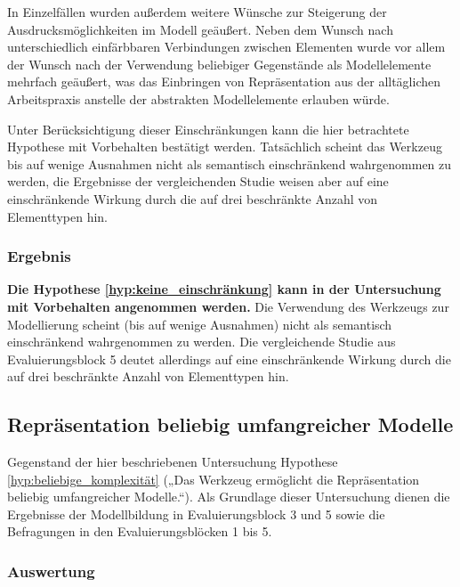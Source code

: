 In Einzelfällen wurden außerdem weitere Wünsche zur Steigerung der Ausdrucksmöglichkeiten im Modell geäußert. Neben dem Wunsch nach unterschiedlich einfärbbaren Verbindungen zwischen Elementen wurde vor allem der Wunsch nach der Verwendung beliebiger Gegenstände als Modellelemente mehrfach geäußert, was das Einbringen von Repräsentation aus der alltäglichen Arbeitspraxis anstelle der abstrakten Modellelemente erlauben würde.

Unter Berücksichtigung dieser Einschränkungen kann die hier betrachtete Hypothese mit Vorbehalten bestätigt werden. Tatsächlich scheint das Werkzeug bis auf wenige Ausnahmen nicht als semantisch einschränkend wahrgenommen zu werden, die Ergebnisse der vergleichenden Studie weisen aber auf eine einschränkende Wirkung durch die auf drei beschränkte Anzahl von Elementtypen hin.

\subsubsection{Ergebnis} %

\textbf{Die Hypothese \ref{hyp:keine_einschränkung} kann in der Untersuchung mit Vorbehalten angenommen werden.} Die Verwendung des Werkzeugs zur Modellierung scheint (bis auf wenige Ausnahmen) nicht als semantisch einschränkend wahrgenommen zu werden. Die vergleichende Studie aus Evaluierungsblock 5 deutet allerdings auf eine einschränkende Wirkung durch die auf drei beschränkte Anzahl von Elementtypen hin.


\subsection{Repräsentation beliebig umfangreicher Modelle} %
\label{sub:repräsentation_beliebig_komplexer_modelle}

Gegenstand der hier beschriebenen Untersuchung Hypothese \ref{hyp:beliebige_komplexität} („Das Werkzeug ermöglicht die Repräsentation beliebig umfangreicher Modelle.“). Als Grundlage dieser Untersuchung dienen die Ergebnisse der Modellbildung in Evaluierungsblock 3 und 5 sowie die Befragungen in den Evaluierungsblöcken 1 bis 5.

\subsubsection{Auswertung} %

